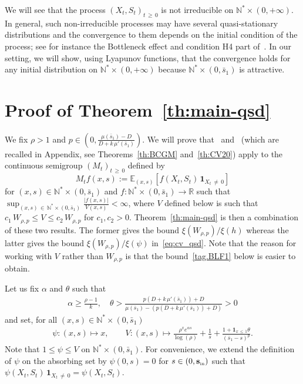 \documentclass[AHL,Unicode,longabstracts,published]{cedram}
\newcommand{\RR}{\mathbb{R}}
\newcommand{\NN}{\mathbb{N}}
\newcommand{\EE}{\mathbb{E}}
\newcommand{\Sin}{{\mathbf s}_{\textrm{\tiny\rm in}}}
\newcommand{\1}{\mathbf{1}}
\begin{document}
We will see that the process $(X_t,S_t)_{t\,\geq\,0}$ is not irreducible on $ \NN^* \times (0,+\infty)$. In general, such non-irreducible processes may have several quasi-stationary distributions and the convergence to them depends on the initial condition of the process; see for instance the Bottleneck effect and condition H4 part of~\cite[Section~3.1]{BCP}. In our setting, we will show, using Lyapunov functions, that the convergence holds for any initial distribution on $ \NN^* \times (0,+\infty)$ because $\NN^* \times (0,\bar s_1)$ is attractive.



\section{Proof of Theorem~\ref{th:main-qsd}}\label{se:proof}



We fix $\rho>1$ and $p\in(0,\frac{\mu(\bar s_1)-D}{D+k\,\mu'(\bar s_1)})$. We will prove that~\cite[Theorem~5.1]{BCGM} and~\cite[Corollary~2.4]{CV20} (which are recalled in Appendix, see Theorems~\ref{th:BCGM} and~\ref{th:CV20}) apply to the continuous semigroup $(M_t)_{t\,\geq\,0}$ defined by
\begin{equation}\label{eq.def.semigroup}
M_t f(x,s) := \EE_{(x,s)}\left[f(X_t, S_t)\,\1_{X_t\,\neq\,0}\right]
\end{equation}
for $(x,s)\in \NN^*\times (0, \bar s_1)$ and $f:\NN^*\times (0, \bar s_1) \to \RR$ such that $\sup_{(x,s)\,\in\,\NN^*\times (0, \bar s_1)}\frac{|f(x,s)|}{V(x,s)}<\infty$, where $V$ defined below is such that $c_1 \,W_{\rho,p} \leq V \leq c_2\, W_{\rho,p}$ for $c_1,c_2>0$. Theorem~\ref{th:main-qsd} is then a combination of these two results. The former gives the bound $\xi(W_{\rho,p})/\xi(h)$ whereas the latter gives the bound $\xi(W_{\rho,p})/\xi(\psi)$ in~\eqref{eq:cv_qsd}. Note that the reason for working with $V$ rather than $W_{\rho,p}$ is that the bound~\eqref{tag.BLF1} below is easier to obtain.

Let us fix $\alpha$ and $\theta$ such that
\begin{align}\label{hyp:theta_p}
\alpha \geq \frac{\rho-1}{k}, \quad
\theta>\frac{p\left(D+k\,\mu'(\bar s_1)\right)+D}{\mu(\bar s_1)-\left(p(D+k\,\mu'(\bar s_1))+D\right)}>0
\end{align}
and set, for all $(x,s)\in\NN^*\times (0,\bar s_1)$
\begin{align}\label{def:psi_V}
\psi:(x,s) \mapsto x, \qquad V:(x,s) \mapsto \frac{\rho^x e^{\alpha s}}{\log(\rho)} + \frac{1}{s} + \frac{1+\1_{x\,\leq\,1}\theta}{(\bar s_1-s)^{p}}.
\end{align}
Note that $1\leq\psi \leq V$ on $\NN^*\times (0,\bar s_1)$. For convenience, we extend the definition of $\psi$ on the absorbing set by $\psi(0,s)= 0$ for $s\in (0,\Sin)$ such that $\psi(X_t,S_t) \,\1_{X_t\,\neq \,0}=\psi(X_t,S_t)$.
\end{document}

